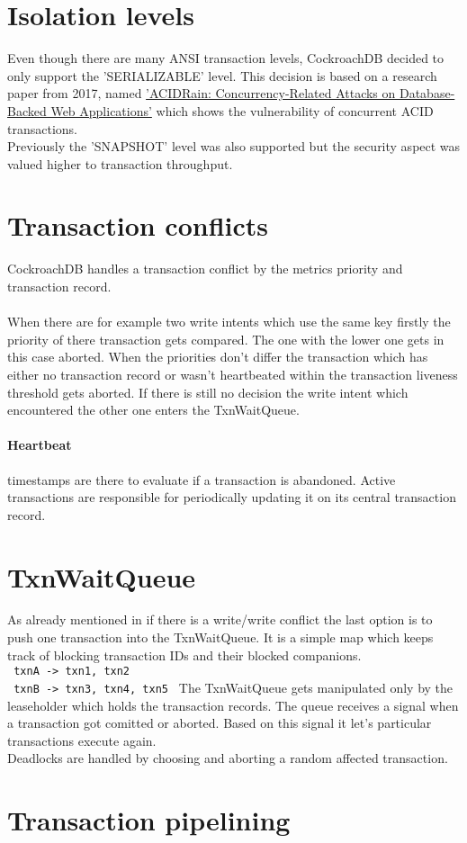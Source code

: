 \documentclass[12pt,a4paper]{article}
\newcommand{\graycode}[1]{\colorbox{codegray}{\texttt{#1}}}
\begin{document}
\section{Isolation levels}
Even though there are many ANSI transaction levels, CockroachDB decided to only support the 'SERIALIZABLE' level.
This decision is based on a research paper from 2017, named \href{http://www.bailis.org/papers/acidrain-sigmod2017.pdf}
{'ACIDRain: Concurrency-Related Attacks on Database-Backed Web Applications'} which shows the vulnerability of concurrent 
ACID transactions.\\
Previously the 'SNAPSHOT' level was also supported but the security aspect was valued higher to transaction throughput.

\section{Transaction conflicts}
\label{sec:transactionconflicts}
CockroachDB handles a transaction conflict by the metrics priority and transaction record.\\\\
When there are for example two write intents which use the same key firstly the priority of there transaction gets compared.
The one with the lower one gets in this case aborted. When the priorities don't differ the transaction which has either no
transaction record or wasn't heartbeated within the transaction liveness threshold gets aborted. If there is still no
decision the write intent which encountered the other one enters the TxnWaitQueue.

\paragraph{Heartbeat} timestamps are there to evaluate if a transaction is abandoned. Active transactions are 
responsible for periodically updating it on its central transaction record. 

\section{TxnWaitQueue}
As already mentioned in  if there is a write/write conflict the last option is to push one
transaction into the TxnWaitQueue. It is a simple map which keeps track of blocking transaction IDs and their blocked 
companions.\\
\graycode{
	txnA -> txn1, txn2
}\\
\graycode{
	txnB -> txn3, txn4, txn5
}
The TxnWaitQueue gets manipulated only by the  leaseholder which holds the transaction 
records. The queue receives a signal when a transaction got comitted or aborted. Based on this signal it let's particular
transactions execute again.\\
Deadlocks are handled by choosing and aborting a random affected transaction.

\section{Transaction pipelining}
\end{document}
